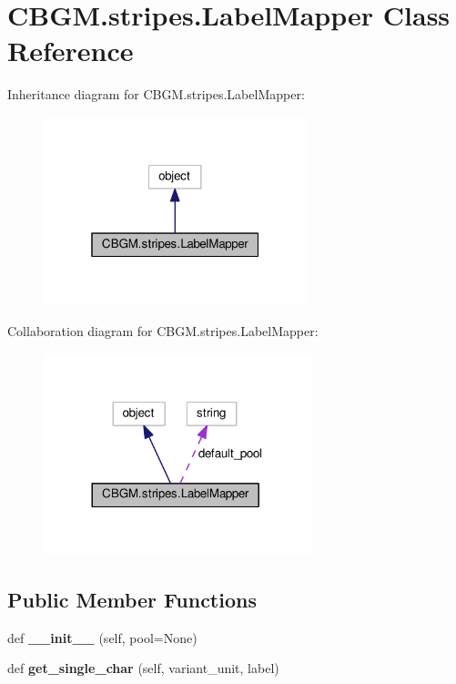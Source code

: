\hypertarget{classCBGM_1_1stripes_1_1LabelMapper}{}\section{C\+B\+G\+M.\+stripes.\+Label\+Mapper Class Reference}
\label{classCBGM_1_1stripes_1_1LabelMapper}


Inheritance diagram for C\+B\+G\+M.\+stripes.\+Label\+Mapper\+:\nopagebreak
\begin{figure}[H]
\begin{center}
\leavevmode
\includegraphics[width=217pt]{classCBGM_1_1stripes_1_1LabelMapper__inherit__graph}
\end{center}
\end{figure}


Collaboration diagram for C\+B\+G\+M.\+stripes.\+Label\+Mapper\+:\nopagebreak
\begin{figure}[H]
\begin{center}
\leavevmode
\includegraphics[width=221pt]{classCBGM_1_1stripes_1_1LabelMapper__coll__graph}
\end{center}
\end{figure}
\subsection*{Public Member Functions}
\begin{DoxyCompactItemize}
\item 
\mbox{\label{classCBGM_1_1stripes_1_1LabelMapper_aa2992ee2fb7885dc67e30626433ab467}} 
def {\bfseries \+\_\+\+\_\+init\+\_\+\+\_\+} (self, pool=None)
\item 
\mbox{\label{classCBGM_1_1stripes_1_1LabelMapper_a1e285e1fd2db5f10cacf4e18e7f688cf}} 
def {\bfseries get\+\_\+single\+\_\+char} (self, variant\+\_\+unit, label)
\end{DoxyCompactItemize}
